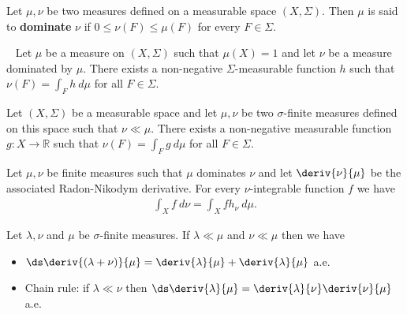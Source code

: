     \begin{definition}
            Let $\mu, \nu$ be two measures defined on a measurable space $(X, \Sigma)$. Then $\mu$ is said to \textbf{dominate} $\nu$ if $0\leq\nu(F)\leq\mu(F)$ for every $F\in\Sigma$.
    \end{definition}

    \begin{theorem}~\newline
        Let $\mu$ be a measure on $(X, \Sigma)$ such that $\mu(X) = 1$ and let $\nu$ be a measure dominated by $\mu$. There exists a non-negative $\Sigma$-measurable function $h$ such that $\nu(F) = \int_F h\ d\mu$ for all $F\in\Sigma$.
    \end{theorem}


    \begin{theorem}
        Let $(X,\Sigma)$ be a measurable space and let $\mu,\nu$ be two $\sigma$-finite measures defined on this space such that $\nu\ll\mu$. There exists a non-negative measurable function $g:X\rightarrow\mathbb{R}$ such that $\nu(F) = \int_F g\ d\mu$ for all $F\in\Sigma$.
    \end{theorem}

    \begin{property}
        Let $\mu, \nu$ be finite measures such that $\mu$ dominates $\nu$ and let $\deriv{\nu}{\mu}$ be the associated Radon-Nikodym derivative. For every $\nu$-integrable function $f$ we have
        \begin{gather}
            \int_X f\ d\nu = \int_X fh_\nu\ d\mu.
        \end{gather}
    \end{property}

    \begin{property}
        Let $\lambda,\nu$ and $\mu$ be $\sigma$-finite measures. If $\lambda\ll\mu$ and $\nu\ll\mu$ then we have
        \begin{itemize}
            \item $\ds\deriv{(\lambda+\nu)}{\mu} = \deriv{\lambda}{\mu} + \deriv{\lambda}{\mu}$ a.e.
            \item Chain rule: if $\lambda\ll\nu$ then $\ds\deriv{\lambda}{\mu} = \deriv{\lambda}{\nu}\deriv{\nu}{\mu}$ a.e.
        \end{itemize}
    \end{property}